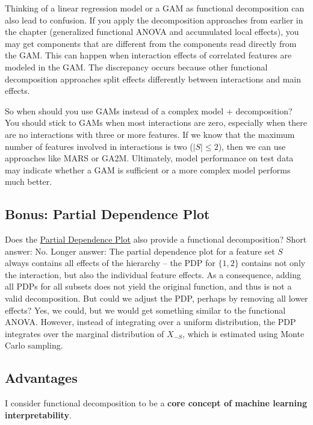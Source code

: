 \documentclass[
  11pt,
]{scrbook}
\begin{document}
Thinking of a linear regression model or a GAM as functional decomposition can also lead to confusion.
If you apply the decomposition approaches from earlier in the chapter (generalized functional ANOVA and accumulated local effects), you may get components that are different from the components read directly from the GAM.
This can happen when interaction effects of correlated features are modeled in the GAM.
The discrepancy occurs because other functional decomposition approaches split effects differently between interactions and main effects.

So when should you use GAMs instead of a complex model + decomposition?
You should stick to GAMs when most interactions are zero, especially when there are no interactions with three or more features.
If we know that the maximum number of features involved in interactions is two (\(|S|\leq{}2\)), then we can use approaches like MARS or GA2M.
Ultimately, model performance on test data may indicate whether a GAM is sufficient or a more complex model performs much better.

\hypertarget{bonus-partial-dependence-plot}{%
\subsection{Bonus: Partial Dependence Plot}\label{bonus-partial-dependence-plot}}

Does the \protect\hyperlink{pdp}{Partial Dependence Plot} also provide a functional decomposition?
Short answer: No.
Longer answer:
The partial dependence plot for a feature set \(S\) always contains all effects of the hierarchy -- the PDP for \(\{1,2\}\) contains not only the interaction, but also the individual feature effects.
As a consequence, adding all PDPs for all subsets does not yield the original function, and thus is not a valid decomposition.
But could we adjust the PDP, perhaps by removing all lower effects?
Yes, we could, but we would get something similar to the functional ANOVA.
However, instead of integrating over a uniform distribution, the PDP integrates over the marginal distribution of \(X_{-S}\), which is estimated using Monte Carlo sampling.

\hypertarget{advantages-8}{%
\subsection{Advantages}\label{advantages-8}}

I consider functional decomposition to be a \textbf{core concept of machine learning interpretability}.
\end{document}

